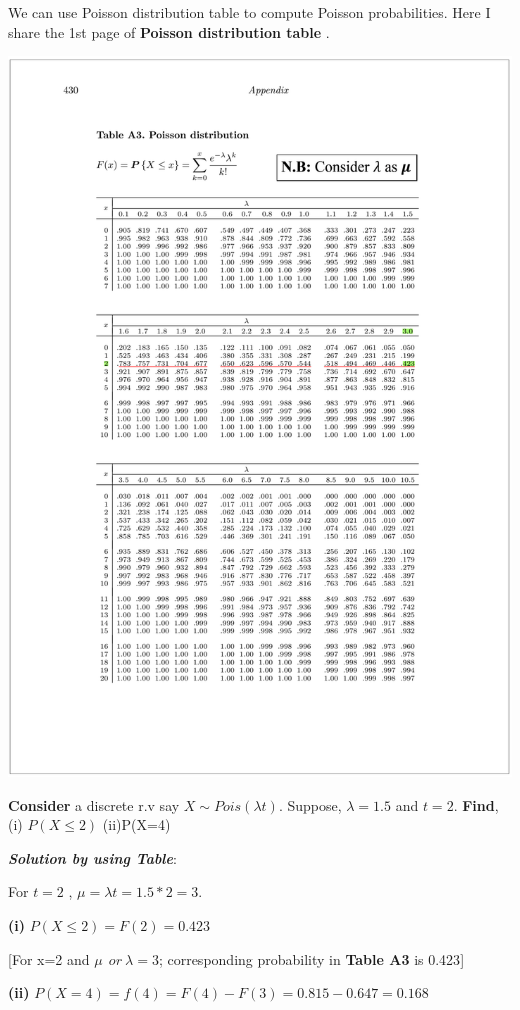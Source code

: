 \documentclass[
]{article}
\begin{document}
We can use Poisson distribution table to compute Poisson probabilities. Here I share the 1st page of \textbf{Poisson distribution table} \citep{baron_probability_2019}.

\includegraphics{Poisson Table.png}

\textbf{Consider} a discrete r.v say \(X\sim Pois(\lambda t)\). Suppose, \(\lambda =1.5\) and \(t=2\). \textbf{Find}, (i) \(P(X \le 2)\) (ii)P(X=4)

\textbf{\emph{Solution by using Table}}:

For \(t=2\) , \(\mu=\lambda t=1.5*2=3\).

\textbf{(i)} \(P(X \le 2)=F(2)=0.423\)

{[}For x=2 and \(\mu \ \ or \ \lambda =3\); corresponding probability in \textbf{Table A3} is 0.423{]}

\textbf{(ii)} \(P(X=4)=f(4)=F(4)-F(3)=0.815-0.647=0.168\)
\end{document}
